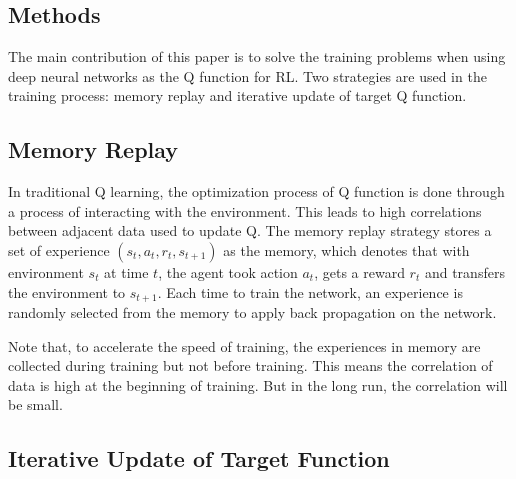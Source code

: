 \documentclass[10pt,twocolumn,letterpaper]{article}
\begin{document}
\begin{CJK}{UTF8}{gbsn}
\section {Methods}

The main contribution of this paper is to solve the training problems when using deep neural networks as the Q function for RL. Two strategies are used in the training process: memory replay and iterative update of target Q function.

\subsection{Memory Replay}

In traditional Q learning, the optimization process of Q function is done through a process of interacting with the environment. This leads to high correlations between adjacent data used to update Q. The memory replay strategy stores a set of experience $(s_t, a_t, r_t, s_{t+1})$ as the memory, which denotes that with environment $s_t$ at time $t$, the agent took action $a_t$, gets a reward $r_{t}$ and transfers the environment to $s_{t+1}$. Each time to train the network, an experience is randomly selected from the memory to apply back propagation on the network.

Note that, to accelerate the speed of training, the experiences in memory are collected during training but not before training. This means the correlation of data is high at the beginning of training. But in the long run, the correlation will be small.

\subsection{Iterative Update of Target Function}


\end{CJK}
\end{document}
